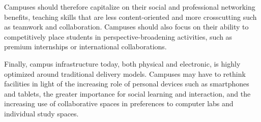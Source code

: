 Campuses should therefore capitalize on their social and professional
networking benefits, teaching skills that are less content-oriented and
more crosscutting such as teamwork and collaboration.
Campuses should also focus on their ability to competitively place
students in perspective-broadening
activities, such as premium internships or international collaborations.

Finally, campus infrastructure today, both physical and electronic, is
highly optimized around traditional delivery models.
Campuses may have to rethink facilities in light of the increasing role
of personal devices such as 
smartphones and tablets, the greater importance for social learning and
interaction, and the increasing use of collaborative spaces in
preferences to computer labs and individual study spaces.

